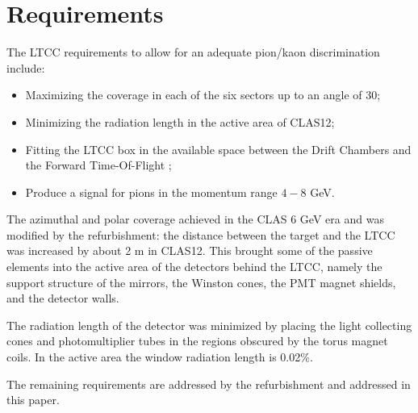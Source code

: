 \section{Requirements}


The LTCC requirements to allow for an adequate pion/kaon discrimination include:


\begin{itemize}
	\item Maximizing the coverage in each of the six sectors up to an angle of 30\mdeg;
	\item Minimizing the radiation length in the active area of CLAS12;
	\item Fitting the LTCC box in the available space between the Drift Chambers \cite{dc2019} and the Forward Time-Of-Flight \cite{ftof2019};
	\item Produce a signal for pions in the momentum range $4-8$ GeV.
\end{itemize}

The azimuthal and polar coverage achieved in the CLAS 6 GeV era and was modified by the refurbishment:
the distance between the target and the LTCC was increased by about 2 m in CLAS12. This brought some of the passive
elements into the active area of the detectors behind the LTCC, namely the support structure of the mirrors, the Winston
cones, the PMT magnet shields, and the detector walls.

The radiation length of the detector was minimized by placing the light collecting cones and photomultiplier tubes
in the regions obscured by the torus magnet coils. In the active area the window radiation length is 0.02$\%$.

The remaining requirements are addressed by the refurbishment and addressed in this paper.
